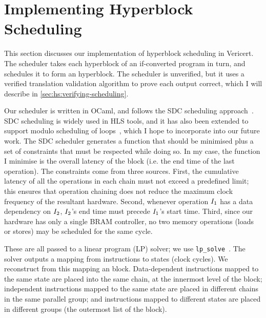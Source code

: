 \section{Implementing Hyperblock Scheduling}
\label{sec:hs:implementing-scheduling}

This section discusses our implementation of hyperblock scheduling in Vericert.
The scheduler takes each hyperblock of an if-converted \rtlblock{} program in
turn, and schedules it to form an \rtlpar{} hyperblock. The scheduler is
unverified, but it uses a verified translation validation algorithm to prove
each output correct, which I will describe in
\cref{sec:hs:verifying-scheduling}.

Our scheduler is written in OCaml, and follows the SDC scheduling
approach~\cite{cong06_sdc}. SDC scheduling is widely used in HLS tools, and it
has also been extended to support modulo scheduling of loops~\cite{zhang13_sdc},
which I hope to incorporate into our future work. The SDC scheduler generates a
function that should be minimised plus a set of constraints that must be
respected while doing so. In my case, the function I minimise is the overall
latency of the block (i.e. the end time of the last
operation). %
The constraints come from three sources. First, the cumulative latency of all
the operations in each chain must not exceed a predefined limit; this ensures
that operation chaining does not reduce the maximum clock frequency of the
resultant hardware. Second, whenever operation $I_1$ has a data dependency
on $I_2$, $I_2$'s end time must precede $I_1$'s start
time. Third, since our hardware has only a single \gls{BRAM} controller, no two
memory operations (loads or stores) may be scheduled for the same cycle.

These are all passed to a linear program (LP) solver; we use
\texttt{lp\_solve}~\cite{berkelaar10}.  The solver outputs a mapping from
instructions to states (clock cycles). We reconstruct from this mapping an
\rtlpar{} block. Data-dependent instructions mapped to the same state are placed
into the same chain, at the innermost level of the \rtlpar{} block; independent
instructions mapped to the same state are placed in different chains in the same
parallel group; and instructions mapped to different states are placed in
different groups (the outermost list of the \rtlpar{} block).


